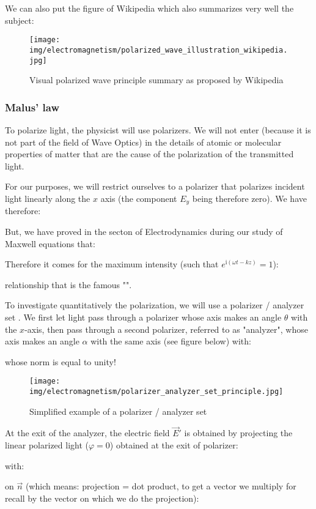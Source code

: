 	We can also put the figure of Wikipedia which also summarizes very well the subject:
	\begin{figure}[H]
		\centering
		\texttt{[image: img/electromagnetism/polarized\_wave\_illustration\_wikipedia.jpg]}
		\caption{Visual polarized wave principle summary as proposed by Wikipedia}
	\end{figure}
	
	\pagebreak
	\subsubsection{Malus' law}
	To polarize light, the physicist will use polarizers. We will not enter (because it is not part of the field of Wave Optics) in the details of atomic or molecular properties of matter that are the cause of the polarization of the transmitted light.

	For our purposes, we will restrict ourselves to a polarizer that polarizes incident light linearly along the $x$ axis (the component $E_y$ being therefore zero). We have therefore:
	
	But, we have proved in the secton of Electrodynamics during our study of Maxwell equations that:
	
	Therefore it comes for the maximum intensity (such that $e^{\mathrm{i}(\omega t-kz)}=1$):
	
	relationship that is the famous "".

	To investigate quantitatively the polarization, we will use a polarizer / analyzer set . We first let light pass through a polarizer whose axis makes an angle $\theta$ with the $x$-axis, then pass through a second polarizer, referred to as "analyzer", whose axis makes an angle $\alpha$ with the same axis (see figure below) with:
	
	whose norm is equal to unity!
	\begin{figure}[H]
		\centering
		\texttt{[image: img/electromagnetism/polarizer\_analyzer\_set\_principle.jpg]}
		\caption{Simplified example of a polarizer / analyzer set}
	\end{figure}
	At the exit of the analyzer, the electric field $\vec{E}'$ is obtained by projecting the linear polarized light ($\varphi=0$) obtained at the exit of polarizer:
	
	with:
	
	on $\vec{n}$ (which means: projection = dot product, to get a vector we multiply for recall by the vector on which we do the projection):
	
